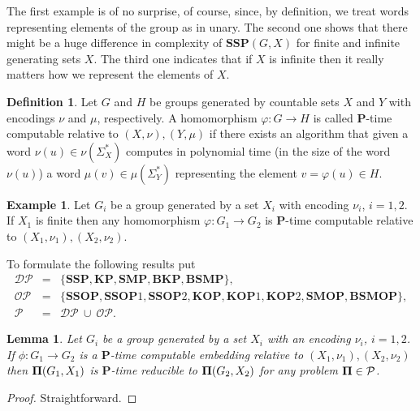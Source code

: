 \documentclass[11pt]{amsart}
\newtheorem{lemma}[theorem]{Lemma}
\theoremstyle{definition}
\newtheorem{example}[theorem]{Example}
\newtheorem{definition}[theorem]{Definition}
\def\P{{\mathbf{P}}}
\def\SSP{{\mathbf{SSP}}}
\def\SMP{{\mathbf{SMP}}}
\def\BSMP{{\mathbf{BSMP}}}
\def\BKP{{\mathbf{BKP}}}
\def\KP{{\mathbf{KP}}}
\def\KOP{{\mathbf{KOP}}}
\def\SSOP{{\mathbf{SSOP}}}
\def\SMOP{{\mathbf{SMOP}}}
\def\BSMOP{{\mathbf{BSMOP}}}
\begin{document}
The first  example is of no surprise, of course, since, by definition,  we  treat words representing elements of the group  as in unary.
The second one shows that there might be a huge difference in complexity of $\SSP(G,X)$ for finite and infinite generating sets $X$. The third one indicates that if $X$ is infinite then it really matters how we represent the elements of $X$.




\begin{definition}
Let $G$ and $H$ be groups generated by countable sets $X$ and $Y$ with encodings $\nu$ and $\mu$, respectively. A homomorphism $\varphi:G \to H$
is called $\P$-time computable relative to $(X,\nu), (Y,\mu)$
if there exists an algorithm that
given a word $\nu(u) \in \nu(\Sigma_X^*)$
computes in polynomial time  (in the size of the word $\nu(u)$)  a word $\mu(v) \in \mu(\Sigma_Y^{\ast})$
representing  the element $v=\varphi(u)\in H$.
\end{definition}

\begin{example} \label{ex:finite}
Let $G_i$ be a group generated by a set $X_i$ with encoding $\nu_i$, $i = 1,2$. If $X_1$ is finite then any homomorphism $\varphi:G_1 \to G_2$ is
$\P$-time computable relative to $(X_1,\nu_1), (X_2,\nu_2)$.
\end{example}
To formulate the  following results put
\begin{eqnarray*}
{\mathcal{DP}} &=& \{\SSP,\KP,\SMP,\BKP,\BSMP\},\\
{\mathcal{OP}} &=& \{\SSOP,\SSOP1,\SSOP2, \KOP,\KOP1, \KOP2,\SMOP,\BSMOP\},\\
{\mathcal P}&=&{\mathcal{DP}}\ \cup\ {\mathcal{OP}}.
\end{eqnarray*}



\begin{lemma}\label{le:SSP_reduction}
Let $G_i$ be a group generated by a set $X_i$ with an encoding $\nu_i$, $i = 1,2$. If $\phi:G_1 \to G_2$ is a $\P$-time computable embedding
relative to $(X_1,\nu_1), (X_2,\nu_2)$ then   ${\bf \Pi}(G_1,X_1)$ is $\P$-time  reducible to ${\bf \Pi}(G_2,X_2)$ for any problem ${\bf \Pi} \in \mathcal{P}$.

\end{lemma}

\begin{proof}
Straightforward.
\end{proof}
\end{document}
